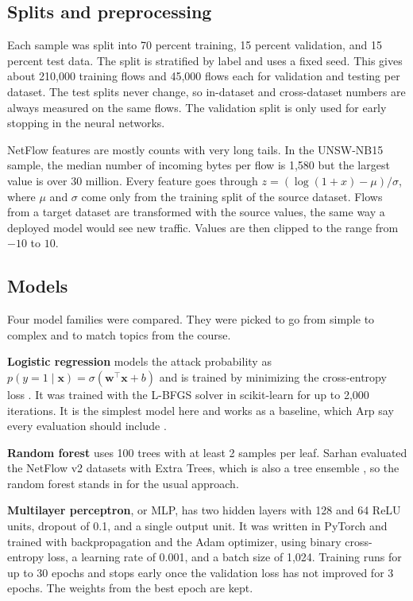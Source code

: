 \subsection{Splits and preprocessing}

Each sample was split into 70 percent training, 15 percent validation, and 15 percent test data. The split is stratified by label and uses a fixed seed. This gives about 210,000 training flows and 45,000 flows each for validation and testing per dataset. The test splits never change, so in-dataset and cross-dataset numbers are always measured on the same flows. The validation split is only used for early stopping in the neural networks.

NetFlow features are mostly counts with very long tails. In the UNSW-NB15 sample, the median number of incoming bytes per flow is 1,580 but the largest value is over 30 million. Every feature goes through \mbox{$z = (\log(1 + x) - \mu) / \sigma$}, where $\mu$ and $\sigma$ come only from the training split of the source dataset. Flows from a target dataset are transformed with the source values, the same way a deployed model would see new traffic. Values are then clipped to the range from $-10$ to $10$.

\subsection{Models}

Four model families were compared. They were picked to go from simple to complex and to match topics from the course.

\textbf{Logistic regression} models the attack probability as $p(y = 1 \mid \mathbf{x}) = \sigma(\mathbf{w}^\top \mathbf{x} + b)$ and is trained by minimizing the cross-entropy loss \cite{bishop2006}. It was trained with the L-BFGS solver in scikit-learn \cite{pedregosa2011} for up to 2,000 iterations. It is the simplest model here and works as a baseline, which Arp \etal say every evaluation should include \cite{arp2022}.

\textbf{Random forest} uses 100 trees with at least 2 samples per leaf. Sarhan \etal evaluated the NetFlow v2 datasets with Extra Trees, which is also a tree ensemble \cite{sarhan2022}, so the random forest stands in for the usual approach.

\textbf{Multilayer perceptron}, or MLP, has two hidden layers with 128 and 64 ReLU units, dropout of 0.1, and a single output unit. It was written in PyTorch \cite{paszke2019} and trained with backpropagation and the Adam optimizer, using binary cross-entropy loss, a learning rate of 0.001, and a batch size of 1,024. Training runs for up to 30 epochs and stops early once the validation loss has not improved for 3 epochs. The weights from the best epoch are kept.

